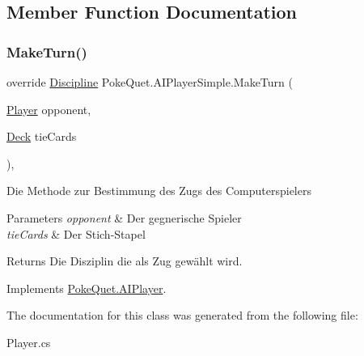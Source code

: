\subsection{Member Function Documentation}
\mbox{\label{class_poke_quet_1_1_a_i_player_simple_a4c48360666f3fc8b7400cbfa2c7ea29e}} 
\subsubsection{\texorpdfstring{Make\+Turn()}{MakeTurn()}}
{\footnotesize\ttfamily override \mbox{\hyperlink{namespace_poke_quet_aa425f1b8cf90847021fe1177d6a7199d}{Discipline}} Poke\+Quet.\+A\+I\+Player\+Simple.\+Make\+Turn (\begin{DoxyParamCaption}\item[{\mbox{\hyperlink{class_poke_quet_1_1_player}{Player}}}]{opponent,  }\item[{\mbox{\hyperlink{class_poke_quet_1_1_deck}{Deck}}}]{tie\+Cards }\end{DoxyParamCaption})\hspace{0.3cm}{\ttfamily [inline]}, {\ttfamily [virtual]}}



Die Methode zur Bestimmung des Zugs des Computerspielers 


\begin{DoxyParams}{Parameters}
{\em opponent} & Der gegnerische Spieler\\
\hline
{\em tie\+Cards} & Der Stich-\/\+Stapel\\
\hline
\end{DoxyParams}
\begin{DoxyReturn}{Returns}
Die Disziplin die als Zug gewählt wird.
\end{DoxyReturn}


Implements \mbox{\hyperlink{class_poke_quet_1_1_a_i_player_ae2862ead657c524614793ea4d3ebf80b}{Poke\+Quet.\+A\+I\+Player}}.



The documentation for this class was generated from the following file\+:\begin{DoxyCompactItemize}
\item 
Player.\+cs\end{DoxyCompactItemize}
